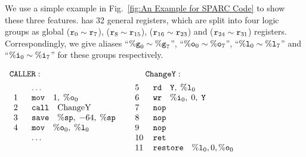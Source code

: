 We use a simple example
in Fig.~\ref{fig:An Example for SPARC Code}
to show these three features.
\sparc{} has 32 general registers, which are split into four
logic groups
as \textsf{global} ($\texttt{r}_{0} \sim \texttt{r}_{7}$),
\outRN{} ($\texttt{r}_{8} \sim \texttt{r}_{15}$),
\localRN{} ($\texttt{r}_{16} \sim \texttt{r}_{23}$) and
\inRN{} ($\texttt{r}_{24} \sim \texttt{r}_{31}$) registers.
Correspondingly, we give aliases ``$\%\texttt{g}_{0} \sim \%\texttt{g}_{7}$'',
``$\%\texttt{o}_{0} \sim \%\texttt{o}_{7}$'', ``$\%\texttt{l}_{0} \sim \%\texttt{l}_{7}$''
and ``$\%\texttt{i}_{0} \sim \%\texttt{i}_{7}$'' for these groups
respectively.
\vspace*{-1em}
\begin{center}
    $
        \begin{array}{ll}
            \texttt{CALLER}: &
            \quad\hspace*{2.5ex} \texttt{ChangeY} : \\[1ex]
            \begin{array}{ll}
                \quad & \dots \\
                \text{1} \ \ & \texttt{mov} \quad 1, \; \%\texttt{o}_{0} \\
                \text{2} & \texttt{call} \quad \text{ChangeY} \\
                \text{3} &
                    \texttt{save} \quad \%\texttt{sp}, \; -64, \; \%\texttt{sp} \\
                \text{4} &
                    \texttt{mov} \quad \%\texttt{o}_{0}, \; \%\texttt{l}_{0} \\
                \quad & \dots \\
                \quad
            \end{array} & \
            \begin{array}{ll}
                \text{5} \ \ &
                    \texttt{rd} \quad \texttt{Y}, \; \%\texttt{l}_{0} \\
                \text{6} &
                    \texttt{wr} \quad \%\texttt{i}_{0}, \; 0, \; \texttt{Y} \\
                \text{7} & \texttt{nop} \\
                \text{8} & \texttt{nop} \\
                \text{9} & \texttt{nop} \\
                \text{10} & \texttt{ret} \\
                \text{11} &
                    \texttt{restore} \quad \%\texttt{l}_{0}, 0, \%\texttt{o}_{0}
            \end{array}
        \end{array}
    $
    \label{fig:An Example for SPARC Code}
\end{center}

